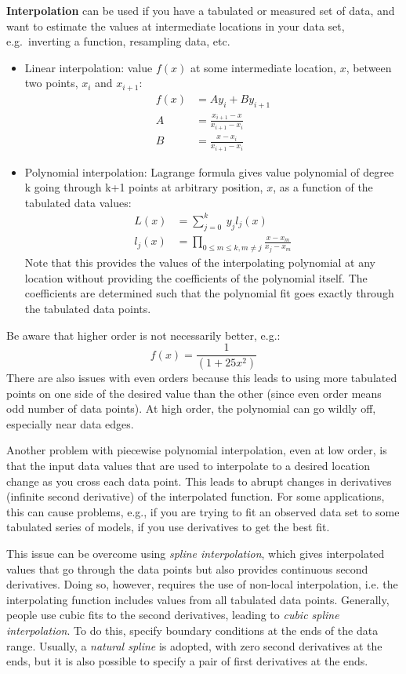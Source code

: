 \documentclass[12pt]{article}
\begin{document}
\textbf{Interpolation} can be used if you have a tabulated or measured set of
data, and want to estimate the values at intermediate locations in your data
set, e.g.\ inverting a function, resampling data, etc.
\begin{itemize}
    \item Linear interpolation: value $f(x)$ at some intermediate location,
        $x$, between two points, $x_i$ and $x_{i+1}$:
        \begin{align*}
            f(x) &= Ay_i + By_{i+1} \\
            A &= \frac{x_{i+1}-x}{x_{i+1}-x_i} \\
            B &= \frac{x-x_i}{x_{i+1}-x_i}
        \end{align*}
    \item Polynomial interpolation: Lagrange formula gives value polynomial
        of degree k going through k+1 points at arbitrary position, $x$, as
        a function of the tabulated data values:
        \begin{align*}
            L(x) &= \sum ^k_{j=0} \ y_j l_j (x) \\
            l_j(x) &= \prod _{0 \leq m \leq k, m \ne j}
            \frac{x-x_m}{x_j - x_m}
        \end{align*}
        Note that this provides the values of the interpolating polynomial at
        any location without providing the coefficients of the polynomial itself.
        The coefficients are determined such that the polynomial fit goes exactly
        through the tabulated data points.
\end{itemize}
Be aware that higher order is not necessarily better, e.g.:
$$ f(x) = \frac{1}{(1+25x^2)} $$
There are also issues with even orders because this leads to using more tabulated
points on one side of the desired value than the other (since even order means odd
number of data points). At high order, the polynomial can go wildly off, especially
near data edges.

Another problem with piecewise polynomial interpolation, even at low order, is that
the input data values that are used to interpolate to a desired location change as
you cross each data point. This leads to abrupt changes in derivatives (infinite
second derivative) of the interpolated function. For some applications, this can
cause problems, e.g., if you are trying to fit an observed data set to some
tabulated series of models, if you use derivatives to get the best fit.

This issue can be overcome using \emph{spline interpolation}, which gives
interpolated values that go through the data points but also provides continuous
second derivatives. Doing so, however, requires the use of non-local interpolation,
i.e. the interpolating function includes values from all tabulated data points.
Generally, people use cubic fits to the second derivatives, leading to
\emph{cubic spline interpolation}. To do this, specify boundary conditions at
the ends of the data range. Usually, a \emph{natural spline} is adopted, with
zero second derivatives at the ends, but it is also possible to specify a pair
of first derivatives at the ends.
\end{document}
